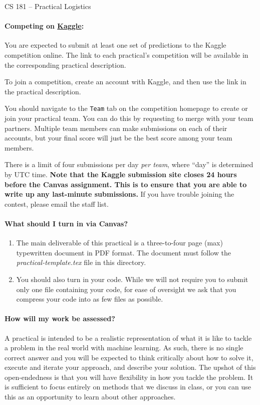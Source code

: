 \documentclass[12pt,letterpaper]{article}
\begin{document}
\begin{center}
  {\large CS 181 -- Practical Logistics}
\end{center}


\paragraph{Competing on \href{https://www.kaggle.com/}{Kaggle}:} You are expected to submit at least one set of predictions to the Kaggle competition online. The link to each practical's competition will be available in the corresponding practical description.   

To join a competition, create an account with Kaggle, and then use the link in the practical description. 

You should navigate to the \texttt{Team} tab on the competition homepage to create or join your practical team. You can do this by requesting to merge with your team partners. Multiple team members can make submissions on each of their accounts, but your final score will just be the best score among your team members. 

There is a limit of four submissions per day \emph{per team}, where ``day'' is determined by UTC time.  \textbf{Note that the Kaggle submission site closes 24 hours before the Canvas assignment.  This is to ensure that you are able to write up any last-minute submissions.} If you have trouble joining the contest, please email the staff list.

\paragraph{What should I turn in via Canvas?}
\begin{enumerate}
    \item The main deliverable of this practical is a three-to-four page (max)
typewritten document in PDF format.  The document must follow the
\textit{practical-template.tex} file in this directory.
    \item You should also turn in your code. While we will not require you to submit only one file containing your code, for ease of oversight we ask that you compress your code into as few files as possible.
\end{enumerate}

\paragraph{How will my work be assessed?}
A practical is intended to be a realistic representation of what it
is like to tackle a problem in the real world with machine learning.
As such, there is no single correct answer and you will be expected to
think critically about how to solve it, execute and iterate your
approach, and describe your solution.  The upshot of this
open-endedness is that you will have flexibility in how you tackle the
problem.  It is sufficient to focus entirely on methods that we
discuss in class, or you can use this as an opportunity to learn about
other approaches.
\end{document}
